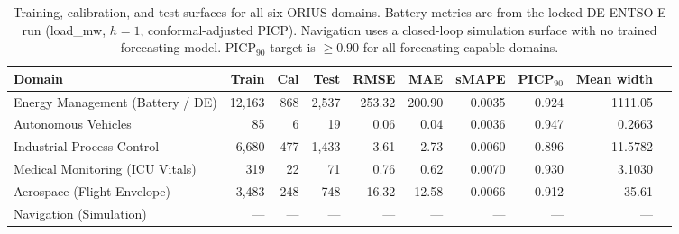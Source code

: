 \begin{table}[htbp]
\centering
\caption{Training, calibration, and test surfaces for all six ORIUS domains.
  Battery metrics are from the locked DE ENTSO-E run (load\_mw, $h{=}1$, conformal-adjusted PICP).
  Navigation uses a closed-loop simulation surface with no trained forecasting model.
  PICP$_{90}$ target is $\geq 0.90$ for all forecasting-capable domains.}
\label{tab:all-domain-training-metrics}
\begin{tabular}{lrrrrrrrrr}
\toprule
Domain & Train & Cal & Test & RMSE & MAE & sMAPE & PICP$_{90}$ & Mean width \\
\midrule
Energy Management (Battery / DE) & 12,163 & 868 & 2,537 & 253.32 & 200.90 & 0.0035 & 0.924 & 1111.05 \\
Autonomous Vehicles & 85 & 6 & 19 & 0.06 & 0.04 & 0.0036 & 0.947 & 0.2663 \\
Industrial Process Control & 6,680 & 477 & 1,433 & 3.61 & 2.73 & 0.0060 & 0.896 & 11.5782 \\
Medical Monitoring (ICU Vitals) & 319 & 22 & 71 & 0.76 & 0.62 & 0.0070 & 0.930 & 3.1030 \\
Aerospace (Flight Envelope) & 3,483 & 248 & 748 & 16.32 & 12.58 & 0.0066 & 0.912 & 35.61 \\
Navigation (Simulation) & — & — & — & — & — & — & — & — \\
\bottomrule
\end{tabular}
\end{table}
